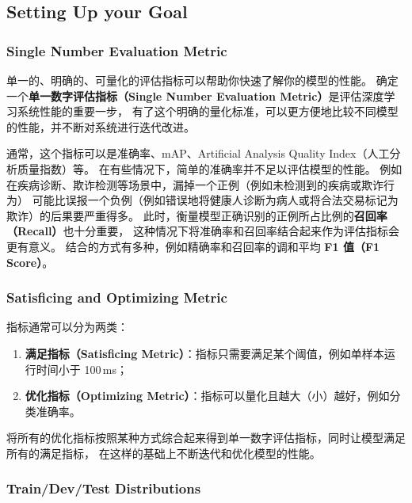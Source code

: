 \subsection{Setting Up your Goal}

\subsubsection{Single Number Evaluation Metric}

单一的、明确的、可量化的评估指标可以帮助你快速了解你的模型的性能。
确定一个\textbf{单一数字评估指标（Single Number Evaluation Metric）}是评估深度学习系统性能的重要一步，
有了这个明确的量化标准，可以更方便地比较不同模型的性能，并不断对系统进行迭代改进。

通常，这个指标可以是准确率、mAP、Artificial Analysis Quality Index（人工分析质量指数）等。
在有些情况下，简单的准确率并不足以评估模型的性能。
例如在疾病诊断、欺诈检测等场景中，漏掉一个正例（例如未检测到的疾病或欺诈行为）
可能比误报一个负例（例如错误地将健康人诊断为病人或将合法交易标记为欺诈）的后果要严重得多。
此时，衡量模型正确识别的正例所占比例的\textbf{召回率（Recall）}也十分重要，
这种情况下将准确率和召回率结合起来作为评估指标会更有意义。
结合的方式有多种，例如精确率和召回率的调和平均 \textbf{F1 值（F1 Score）}。

\subsubsection{Satisficing and Optimizing Metric}

指标通常可以分为两类：

\begin{enumerate}
    \item \textbf{满足指标（Satisficing Metric）}：指标只需要满足某个阈值，例如单样本运行时间小于 100\,ms；
    \item \textbf{优化指标（Optimizing Metric）}：指标可以量化且越大（小）越好，例如分类准确率。
\end{enumerate}

将所有的优化指标按照某种方式综合起来得到单一数字评估指标，同时让模型满足所有的满足指标，
在这样的基础上不断迭代和优化模型的性能。

\subsubsection{Train/Dev/Test Distributions}
\label{sec:train_dev_test_distributions}

